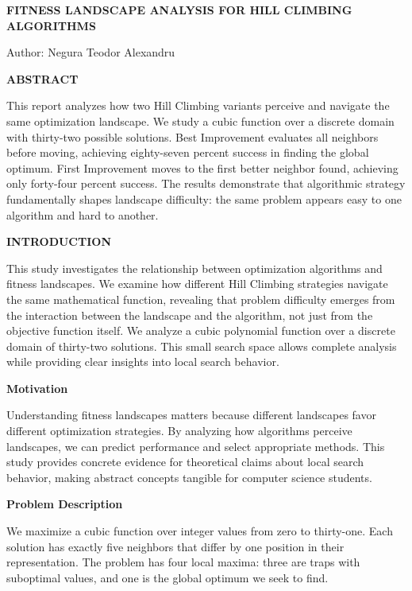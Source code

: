 \documentclass[
]{article}
\author{}
\date{}
\begin{document}
\begin{center}
\textbf{FITNESS LANDSCAPE ANALYSIS FOR HILL CLIMBING ALGORITHMS}
\end{center}

Author: Negura Teodor Alexandru

\begin{center}
\textbf{ABSTRACT}
\end{center}

This report analyzes how two Hill Climbing variants perceive and
navigate the same optimization landscape. We study a cubic function over
a discrete domain with thirty-two possible solutions. Best Improvement
evaluates all neighbors before moving, achieving eighty-seven percent
success in finding the global optimum. First Improvement moves to the
first better neighbor found, achieving only forty-four percent success.
The results demonstrate that algorithmic strategy fundamentally shapes
landscape difficulty: the same problem appears easy to one algorithm and
hard to another.

\begin{center}
\textbf{INTRODUCTION}
\end{center}

This study investigates the relationship between optimization algorithms
and fitness landscapes. We examine how different Hill Climbing
strategies navigate the same mathematical function, revealing that
problem difficulty emerges from the interaction between the landscape
and the algorithm, not just from the objective function itself. We
analyze a cubic polynomial function over a discrete domain of thirty-two
solutions. This small search space allows complete analysis while
providing clear insights into local search behavior.

\textbf{Motivation}

Understanding fitness landscapes matters because different landscapes
favor different optimization strategies. By analyzing how algorithms
perceive landscapes, we can predict performance and select appropriate
methods. This study provides concrete evidence for theoretical claims
about local search behavior, making abstract concepts tangible for
computer science students.

\textbf{Problem Description}

We maximize a cubic
function over integer values from zero to thirty-one. Each solution has
exactly five neighbors that differ by one position in their
representation. The problem has four local maxima: three are traps with
suboptimal values, and one is the global optimum we seek to find.
\end{document}
